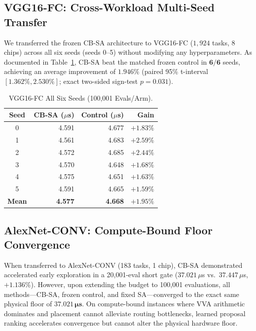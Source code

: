 \documentclass[10pt,conference]{IEEEtran}
\begin{document}
\subsection{VGG16-FC: Cross-Workload Multi-Seed Transfer}
We transferred the frozen CB-SA architecture to VGG16-FC ($1,924$ tasks, 8 chips) across all six seeds (seeds 0--5) without modifying any hyperparameters. As documented in Table~\ref{tab:vgg16-all-seeds}, CB-SA beat the matched frozen control in $\mathbf{6/6}$ seeds, achieving an average improvement of $\mathbf{1.946\%}$ (paired 95\% t-interval $[1.362\%, 2.530\%]$; exact two-sided sign-test $p = 0.031$).

\begin{table}[t]
  \caption{VGG16-FC All Six Seeds (100,001 Evals/Arm).}
  \label{tab:vgg16-all-seeds}
  \centering
  \footnotesize
  \setlength{\tabcolsep}{4.5pt}
  \begin{tabular}{crrr}
    \toprule
    Seed & CB-SA ($\mu$s) & Control ($\mu$s) & Gain \\
    \midrule
    0 & 4.591 & 4.677 & $+1.83\%$ \\
    1 & 4.561 & 4.683 & $+2.59\%$ \\
    2 & 4.572 & 4.685 & $+2.44\%$ \\
    3 & 4.570 & 4.648 & $+1.68\%$ \\
    4 & 4.575 & 4.651 & $+1.63\%$ \\
    5 & 4.591 & 4.665 & $+1.59\%$ \\
    \midrule
    \textbf{Mean} & \textbf{4.577} & \textbf{4.668} & $\mathbf{+1.95\%}$ \\
    \bottomrule
  \end{tabular}
\end{table}

\subsection{AlexNet-CONV: Compute-Bound Floor Convergence}
When transferred to AlexNet-CONV (183 tasks, 1 chip), CB-SA demonstrated accelerated early exploration in a 20,001-eval short gate ($37.021\,\mu$s vs.\ $37.447\,\mu$s, $+1.136\%$). However, upon extending the budget to 100,001 evaluations, all methods—CB-SA, frozen control, and fixed SA—converged to the exact same physical floor of $\mathbf{37.021\,\mu s}$. On compute-bound instances where VVA arithmetic dominates and placement cannot alleviate routing bottlenecks, learned proposal ranking accelerates convergence but cannot alter the physical hardware floor.
\end{document}
